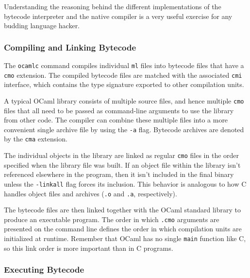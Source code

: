 Understanding the reasoning behind the different implementations of the
bytecode interpreter and the native compiler is a very useful exercise
for any budding language hacker.

\hypertarget{compiling-and-linking-bytecode}{%
\subsubsection{Compiling and Linking
Bytecode}\label{compiling-and-linking-bytecode}}

The \passthrough{\lstinline!ocamlc!} command compiles individual
\passthrough{\lstinline!ml!} files into bytecode files that have a
\passthrough{\lstinline!cmo!} extension. The compiled bytecode files are
matched with the associated \passthrough{\lstinline!cmi!} interface,
which contains the type signature exported to other compilation units.

A typical OCaml library consists of multiple source files, and hence
multiple \passthrough{\lstinline!cmo!} files that all need to be passed
as command-line arguments to use the library from other code. The
compiler can combine these multiple files into a more convenient single
archive file by using the \passthrough{\lstinline!-a!} flag. Bytecode
archives are denoted by the \passthrough{\lstinline!cma!} extension.

The individual objects in the library are linked as regular
\passthrough{\lstinline!cmo!} files in the order specified when the
library file was built. If an object file within the library isn't
referenced elsewhere in the program, then it isn't included in the final
binary unless the \passthrough{\lstinline!-linkall!} flag forces its
inclusion. This behavior is analogous to how C handles object files and
archives (\passthrough{\lstinline!.o!} and \passthrough{\lstinline!.a!},
respectively).

The bytecode files are then linked together with the OCaml standard
library to produce an executable program. The order in which
\passthrough{\lstinline!.cmo!} arguments are presented on the command
line defines the order in which compilation units are initialized at
runtime. Remember that OCaml has no single
\passthrough{\lstinline!main!} function like C, so this link order is
more important than in C programs.

\hypertarget{executing-bytecode}{%
\subsubsection{Executing Bytecode}\label{executing-bytecode}}

